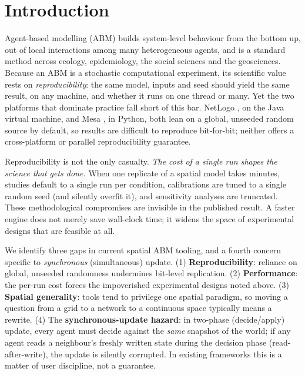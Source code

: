 \documentclass[review]{elsarticle}
\begin{document}
\linenumbers

\section{Introduction}
\label{sec:intro}

Agent-based modelling (ABM) builds system-level behaviour from the bottom up,
out of local interactions among many heterogeneous agents, and is a standard
method across ecology, epidemiology, the social sciences and the geosciences.
Because an ABM is a stochastic computational experiment, its scientific value
rests on \emph{reproducibility}: the same model, inputs and seed should yield
the same result, on any machine, and whether it runs on one thread or many.
Yet the two platforms that dominate practice fall short of this bar. NetLogo
\cite{wilensky1999netlogo}, on the Java virtual machine, and Mesa
\cite{kazil2020mesa}, in Python, both lean on a global, unseeded random source
by default, so results are difficult to reproduce bit-for-bit; neither offers a
cross-platform or parallel reproducibility guarantee.

Reproducibility is not the only casualty. \emph{The cost of a single run shapes
the science that gets done.} When one replicate of a spatial model takes
minutes, studies default to a single run per condition, calibrations are tuned
to a single random seed (and silently overfit it), and sensitivity analyses are
truncated. These methodological compromises are invisible in the published
result. A faster engine does not merely save wall-clock time; it widens the
space of experimental designs that are feasible at all.

We identify three gaps in current spatial ABM tooling, and a fourth concern
specific to \emph{synchronous} (simultaneous) update. (1)
\textbf{Reproducibility}: reliance on global, unseeded randomness undermines
bit-level replication. (2) \textbf{Performance}: the per-run cost forces the
impoverished experimental designs noted above. (3) \textbf{Spatial generality}:
tools tend to privilege one spatial paradigm, so moving a question from a grid
to a network to a continuous space typically means a rewrite. (4) The
\textbf{synchronous-update hazard}: in two-phase (decide/apply) update, every
agent must decide against the \emph{same} snapshot of the world; if any agent
reads a neighbour's freshly written state during the decision phase
(read-after-write), the update is silently corrupted. In existing frameworks
this is a matter of user discipline, not a guarantee.
\end{document}
